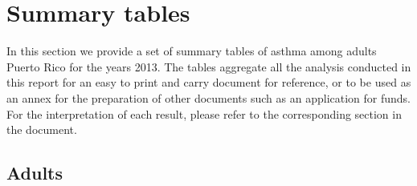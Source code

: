 \newpage
\section{Summary tables}
In this section we provide a set of summary tables of asthma among adults Puerto Rico for the years 2013. The tables aggregate all the analysis conducted in this report for an easy to print and carry document for reference, or to be used as an annex for the preparation of other documents such as an application for funds. For the interpretation of each result, please refer to the corresponding section in the document.

\subsection{Adults}

